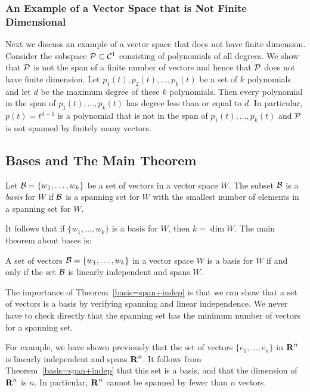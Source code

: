\documentclass{ximera}
\begin{document}
\subsubsection*{An Example of a Vector Space that is Not Finite Dimensional}

Next we discuss an example of a vector space that does not have finite 
dimension.  Consider the subspace ${\cal P}\subset{\cal C}^1$ consisting of 
polynomials  of all degrees.  We show that 
${\cal P}$ is not the span of a finite number of vectors and hence that 
${\cal P}$ does not have finite dimension.  Let $p_1(t),p_2(t),\ldots,p_k(t)$ 
be a set of $k$ polynomials and let $d$ be the maximum degree of these $k$ 
polynomials.  Then every polynomial in the span of $p_1(t),\ldots,p_k(t)$ has 
degree less than or equal to $d$.  In particular, $p(t)=t^{d+1}$ is a 
polynomial that is not in the span of $p_1(t),\ldots,p_k(t)$ and ${\cal P}$ 
is not spanned by finitely many vectors.


\subsection*{Bases and The Main Theorem}

\begin{Def} \label{basis}
Let ${\cal B} = \{w_1,\ldots,w_k\}$ be a set of vectors in a
vector space $W$.  The subset ${\cal B}$ is a {\em basis\/} for $W$
if ${\cal B}$ is a spanning set for $W$ with the smallest number
of elements in a spanning set for $W$.
\end{Def}  

It follows that if $\{w_1,\ldots,w_k\}$ is a basis for $W$, then
$k=\dim W$. The main theorem about bases is:

\begin{thm}  \label{basis=span+indep}
A set of vectors ${\cal B} =\{w_1,\ldots,w_k\}$ in a vector space $W$
is a basis for $W$ if and only if the set ${\cal B}$ is linearly
independent and spans $W$.
\end{thm}   

  The importance of Theorem~\ref{basis=span+indep} is
that we can show that a set of vectors is a basis by verifying spanning
and linear independence.   We never have to check directly that the spanning
set has the minimum number of vectors for a spanning set.


For example, we have shown previously that the set of vectors
$\{e_1,\ldots,e_n\}$ in $\mbox{$\bf{R}$}^n$ is linearly independent and spans $\mbox{$\bf{R}$}^n$.  It
follows from Theorem~\ref{basis=span+indep} that this set is a basis,
and that the dimension of $\mbox{$\bf{R}$}^n$ is $n$.
In particular, $\mbox{$\bf{R}$}^n$ cannot be spanned by fewer than $n$ vectors.
\end{document}
